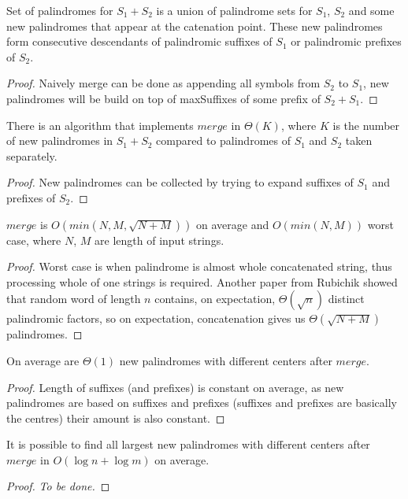 \begin{lemma}
Set of palindromes for $S_1 + S_2$ is a union of
palindrome sets for $S_1$, $S_2$ and some new palindromes
that appear at the catenation point. These new palindromes
form consecutive descendants of palindromic suffixes of $S_1$
or palindromic prefixes of $S_2$.
\end{lemma}
\begin{proof}
  Naively merge can be done as appending all symbols from $S_2$ to $S_1$, new palindromes will be build on top of maxSuffixes of some prefix of $S_2 + S_1$.
\end{proof}

\begin{lemma}
There is an algorithm that implements $merge$ in $\Theta(K)$,
where $K$ is the number of new palindromes in $S_1 + S_2$
compared to palindromes of $S_1$ and $S_2$ taken separately.
\end{lemma}
\begin{proof}
  New palindromes can be collected by trying to expand suffixes of $S_1$ and prefixes of $S_2$.
\end{proof}

\begin{theorem}
$merge$ is $O(min(N, M, \sqrt{N+M}))$ on average
and $O(min(N, M))$ worst case, where $N$, $M$
are length of input strings.
\end{theorem}
\begin{proof}
  Worst case is when palindrome is almost whole concatenated string, thus processing whole of one strings is required. Another paper from Rubichik \cite{rubinchik2016number} showed that random word of length $n$ contains, on expectation, $\Theta(\sqrt{n})$ distinct palindromic factors, so on expectation, concatenation gives us $\Theta(\sqrt{N + M})$ palindromes.
\end{proof}

\begin{proposition}
On average are $\Theta(1)$ new palindromes with different
centers after $merge$.
\end{proposition}
\begin{proof}
  Length of suffixes (and prefixes) is constant on average, as new palindromes are based on suffixes and prefixes (suffixes and prefixes are basically the centres) their amount is also constant.
\end{proof}

\begin{proposition}
It is possible to find all largest new palindromes with different
centers after $merge$ in $O(\log{} n + \log{} m)$ on average.
\end{proposition}
\begin{proof}
  \emph{To be done.}
\end{proof}

